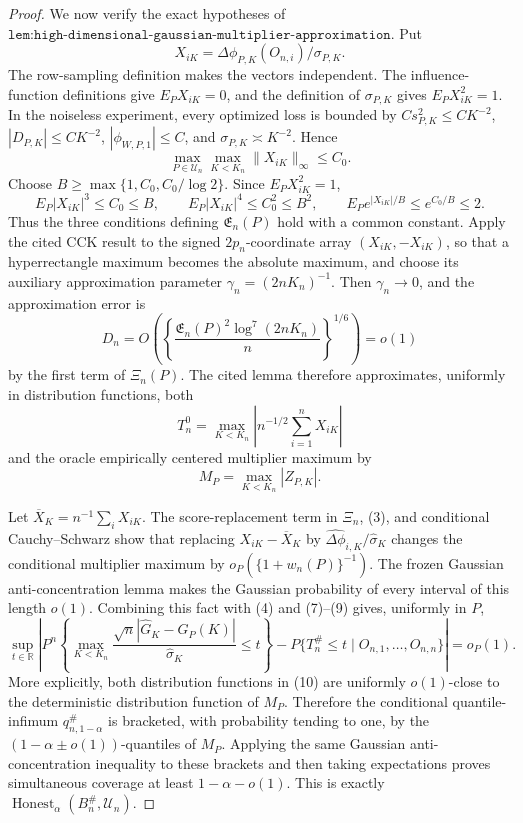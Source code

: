 \documentclass{article}
\begin{document}
\begin{proof}
We now verify the exact hypotheses of \(\texttt{lem:high-dimensional-gaussian-multiplier-approximation}\).  Put
\[
 X_{iK}=\Delta\phi_{P,K}(O_{n,i})/\sigma_{P,K}.
\]
The row-sampling definition makes the vectors independent.  The influence-function definitions give \(E_PX_{iK}=0\), and the definition of \(\sigma_{P,K}\) gives \(E_PX_{iK}^2=1\).  In the noiseless experiment, every optimized loss is bounded by \(Cs_{P,K}^2\leq CK^{-2}\), \(|D_{P,K}|\leq CK^{-2}\), \(|\phi_{W,P,1}|\leq C\), and \(\sigma_{P,K}\asymp K^{-2}\).  Hence
\[
 \max_{P\in\mathcal U_n}\max_{K<K_n}\|X_{iK}\|_\infty\leq C_0.           \tag{5}
\]
Choose \(B\geq\max\{1,C_0,C_0/\log2\}\).  Since \(E_PX_{iK}^2=1\),
\[
 E_P|X_{iK}|^3\leq C_0\leq B,\qquad
 E_P|X_{iK}|^4\leq C_0^2\leq B^2,
 \qquad E_Pe^{|X_{iK}|/B}\leq e^{C_0/B}\leq2.                              \tag{6}
\]
Thus the three conditions defining \(\mathfrak E_n(P)\) hold with a common constant.  Apply the cited CCK result to the signed \(2p_n\)-coordinate array \((X_{iK},-X_{iK})\), so that a hyperrectangle maximum becomes the absolute maximum, and choose its auxiliary approximation parameter \(\gamma_n=(2nK_n)^{-1}\).  Then \(\gamma_n\to0\), and the approximation error is
\[
 D_n=O\!\left(\left\{\frac{\mathfrak E_n(P)^2\log^7(2nK_n)}n\right\}^{1/6}\right)=o(1)              \tag{7}
\]
by the first term of \(\Xi_n(P)\).  The cited lemma therefore approximates, uniformly in distribution functions, both
\[
 T_n^0=\max_{K<K_n}\left|n^{-1/2}\sum_{i=1}^nX_{iK}\right|                 \tag{8}
\]
and the oracle empirically centered multiplier maximum by
\[
 M_P=\max_{K<K_n}|Z_{P,K}|.                                                  \tag{9}
\]

Let \(\overline X_K=n^{-1}\sum_iX_{iK}\).  The score-replacement term in \(\Xi_n\), (3), and conditional Cauchy--Schwarz show that replacing \(X_{iK}-\overline X_K\) by \(\widehat{\Delta\phi}_{i,K}/\widehat\sigma_K\) changes the conditional multiplier maximum by \(o_P(\{1+w_n(P)\}^{-1})\).  The frozen Gaussian anti-concentration lemma makes the Gaussian probability of every interval of this length \(o(1)\).  Combining this fact with (4) and (7)--(9) gives, uniformly in \(P\),
\[
 \sup_{t\in\mathbb R}\left|
 P^n\!\left\{\max_{K<K_n}\frac{\sqrt n|\widehat G_K-G_P(K)|}{\widehat\sigma_K}\leq t\right\}
 -P\{T_n^{\#}\leq t\mid O_{n,1},\ldots,O_{n,n}\}
 \right|=o_P(1).                                                             \tag{10}
\]
More explicitly, both distribution functions in (10) are uniformly \(o(1)\)-close to the deterministic distribution function of \(M_P\).  Therefore the conditional quantile-infimum \(q_{n,1-\alpha}^{\#}\) is bracketed, with probability tending to one, by the \((1-\alpha\pm o(1))\)-quantiles of \(M_P\).  Applying the same Gaussian anti-concentration inequality to these brackets and then taking expectations proves simultaneous coverage at least \(1-\alpha-o(1)\).  This is exactly \(\operatorname{Honest}_{\alpha}(B_n^{\#},\mathcal U_n)\).


\end{proof}
\end{document}
